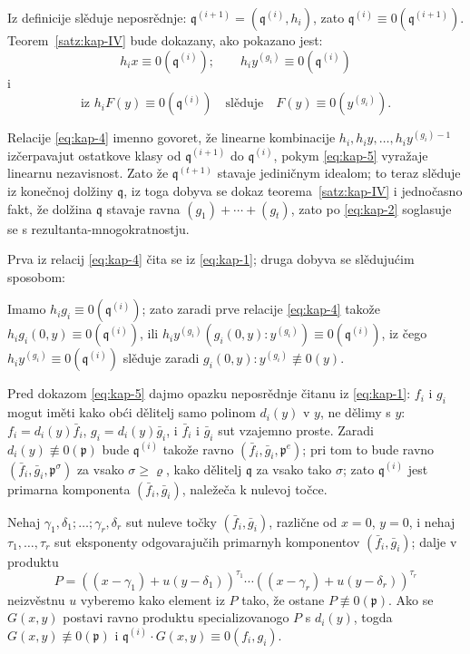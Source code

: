 \documentclass[11pt]{article}
\theoremstyle{plain}
\begin{document}
Iz definicije slěduje neposrědnje:
$\mathfrak{q}^{(i+1)} = (\mathfrak{q}^{(i)}, h_{i})$, zato
$\mathfrak{q}^{(i)} \equiv 0(\mathfrak{q}^{(i+1)})$.
Teorem~\ref{satz:kap-IV} bude dokazany, ako pokazano jest:
\begin{equation}\label{eq:kap-4}
h_{i}x \equiv 0(\mathfrak{q}^{(i)}); \qquad
h_{i}y^{(g_{i})} \equiv 0(\mathfrak{q}^{(i)})
\end{equation}
i
\begin{equation}\label{eq:kap-5}
\text{iz } h_{i}F(y) \equiv 0(\mathfrak{q}^{(i)})
\quad \text{slěduje} \quad F(y) \equiv 0(y^{(g_{i})}).
\end{equation}

Relacije \eqref{eq:kap-4} imenno govoret, že linearne kombinacije
$h_{i}, h_{i}y, \ldots, h_{i}y^{(g_{i})-1}$ izčerpavajut
ostatkove klasy od $\mathfrak{q}^{(i+1)}$ do
$\mathfrak{q}^{(i)}$, pokym \eqref{eq:kap-5} vyražaje linearnu
nezavisnost. Zato že $\mathfrak{q}^{(t+1)}$ stavaje jediničnym
idealom; to teraz slěduje iz konečnoj dolžiny $\mathfrak{q}$,
iz toga dobyva se dokaz teorema~\ref{satz:kap-IV} i jednočasno
fakt, že dolžina $\mathfrak{q}$ stavaje ravna
$(g_{1}) + \cdots + (g_{t})$, zato po \eqref{eq:kap-2} soglasuje se
s rezultanta-mnogokratnostju.

Prva iz relacij \eqref{eq:kap-4} čita se iz \eqref{eq:kap-1};
druga dobyva se slědujućim sposobom:

Imamo $h_{i}g_{i} \equiv 0(\mathfrak{q}^{(i)})$; zato zaradi prve
relacije \eqref{eq:kap-4} takože
$h_{i}g_{i}(0,y) \equiv 0(\mathfrak{q}^{(i)})$, ili
$h_{i}y^{(g_{i})}(g_{i}(0,y):y^{(g_{i})}) \equiv 0(\mathfrak{q}^{(i)})$,
iz čego $h_{i}y^{(g_{i})} \equiv 0(\mathfrak{q}^{(i)})$
slěduje zaradi $g_{i}(0,y):y^{(g_{i})} \not\equiv 0(y)$.

Pred dokazom \eqref{eq:kap-5} dajmo opazku neposrědnje čitanu iz
\eqref{eq:kap-1}: $f_{i}$ i $g_{i}$ mogut iměti kako obći dělitelj
samo polinom $d_{i}(y)$ v $y$, ne dělimy s $y$:
$f_{i} = d_{i}(y)\bar{f}_{i}$, $g_{i} = d_{i}(y)\bar{g}_{i}$, i
$\bar{f}_{i}$ i $\bar{g}_{i}$ sut vzajemno proste. Zaradi
$d_{i}(y) \not\equiv 0(\mathfrak{p})$ bude $\mathfrak{q}^{(i)}$
takože ravno $(\bar{f}_{i}, \bar{g}_{i}, \mathfrak{p}^{e})$;
pri tom to bude ravno
$(\bar{f}_{i}, \bar{g}_{i}, \mathfrak{p}^{\sigma})$ za vsako
$\sigma \geq \varrho$, kako dělitelj $\mathfrak{q}$ za vsako
tako $\sigma$; zato $\mathfrak{q}^{(i)}$ jest primarna komponenta
$(\bar{f}_{i}, \bar{g}_{i})$, naležeča k nulevoj točce.

Nehaj $\gamma_{1}, \delta_{1}; \ldots; \gamma_{r}, \delta_{r}$ sut
nuleve točky $(\bar{f}_{i}, \bar{g}_{i})$, različne od
$x = 0$, $y = 0$, i nehaj $\tau_{1}, \ldots, \tau_{r}$ sut eksponenty
odgovarajučih primarnyh komponentov $(\bar{f}_{i}, \bar{g}_{i})$;
dalje v produktu
\[
P = ((x-\gamma_{1}) + u(y-\delta_{1}))^{\tau_{1}} \cdots
((x-\gamma_{r}) + u(y-\delta_{r}))^{\tau_{r}}
\]
neizvěstnu $u$ vyberemo kako element iz $P$ tako, že ostane
$P \not\equiv 0(\mathfrak{p})$. Ako se $G(x,y)$ postavi ravno
produktu specializovanogo $P$ s $d_{i}(y)$, togda
$G(x,y) \not\equiv 0(\mathfrak{p})$ i
$\mathfrak{q}^{(i)} \cdot G(x,y) \equiv 0(f_{i}, g_{i})$.
\end{document}
